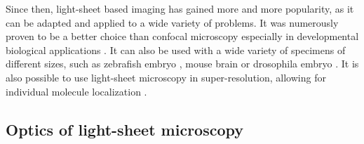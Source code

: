   Since then, light-sheet based imaging has gained more and more popularity, as it can be adapted and applied to a wide variety of problems. It was numerously proven to be a better choice than confocal microscopy \cite{reynaud_light_2008,huisken_selective_2009} especially in developmental biological applications \cite{weber_light_2011}. It can also be used with a wide variety of specimens of different sizes, such as zebrafish embryo \cite{keller_reconstruction_2008,kaufmann_multilayer_2012,mickoleit_high-resolution_2014}, mouse brain \cite{dodt_ultramicroscopy:_2007,} or drosophila embryo \cite{krzic_multiview_2012}. It is also possible to use light-sheet microscopy in super-resolution, allowing for individual molecule localization \cite{cella_zanacchi_live-cell_2011}.


  \subsection{Optics of light-sheet microscopy}

